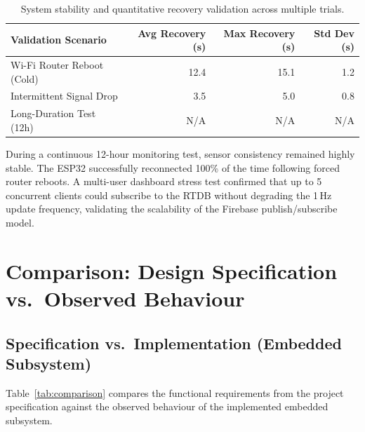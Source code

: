 \begin{table}[H]
	\centering
	\caption{System stability and quantitative recovery validation across multiple trials.}
	\label{tab:stability}
	\begin{tabularx}{\linewidth}{Xrrr}
		\toprule
		\textbf{Validation Scenario} & \textbf{Avg Recovery (s)} & \textbf{Max Recovery (s)} & \textbf{Std Dev (s)} \\
		\midrule
		Wi-Fi Router Reboot (Cold)  & 12.4 & 15.1 & 1.2 \\
		Intermittent Signal Drop    & 3.5  & 5.0  & 0.8 \\
		Long-Duration Test (12h)    & N/A  & N/A  & N/A \\
		\bottomrule
	\end{tabularx}
\end{table}

During a continuous 12-hour monitoring test, sensor consistency remained highly stable. The ESP32 successfully reconnected 100\% of the time following forced router reboots. A multi-user dashboard stress test confirmed that up to 5 concurrent clients could subscribe to the RTDB without degrading the 1\,Hz update frequency, validating the scalability of the Firebase publish/subscribe model.

\section{Comparison: Design Specification vs.\ Observed Behaviour}

\subsection{Specification vs.\ Implementation (Embedded Subsystem)}

Table~\ref{tab:comparison} compares the functional requirements from the project
specification against the observed behaviour of the implemented embedded subsystem.

